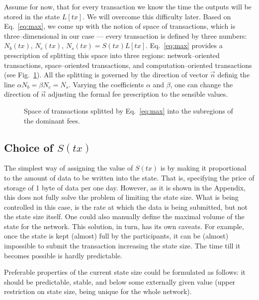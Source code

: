 \documentclass[]{llncs}   %
\newcommand{\authnote}[2]{\marginpar{\parbox{\marginparwidth}{\tiny %
  \textsf{#1 {\textcolor{blue}{notes: #2}}}}}%
  \textcolor{blue}{\textbf{\dag}}}
\newcommand{\authnote}[2]{
  \textsf{#1\textcolor{blue}{ #2}}}
\newcommand{\authnote}[2]{}
\newcommand{\knote}[1]{{\authnote{\textcolor{green}{Alex notes:}}{#1}}}
\newcommand{\vk}[1]{{\authnote{\textcolor{red}{V:}}{#1}}}
\begin{document}
Assume for now, that for every transaction we know the time the outputs will be
stored in the state $L[tx]$. We will overcome this difficulty later. Based on
Eq.~\eqref{eq:max}, we come up with the notion of space of transactions, which
is three--dimensional in our case --- every transaction is defined by three
numbers: $N_b(tx)$, $N_c(tx)$, $N_s(tx) = S(tx)L[tx]$. Eq.~\eqref{eq:max} provides a
prescription of splitting this space into three regions: network--oriented
transactions, space--oriented transactions, and computation--oriented
transactions (see Fig.~\ref{fig:max}). All the splitting is governed by the
direction of vector $\vec{n}$ definig the line $\alpha N_b=\beta N_c=N_s$.
Varying the coefficients $\alpha$ and $\beta$, one can change the direction of
$\vec{n}$ adjusting the formal fee prescription to the sensible values.\vk{It
    would be good and convincing to get some actual data from the existing
network.}
\begin{figure}
    \center
    
    \caption{Space of transactions splitted by
        Eq.~\eqref{eq:max} into the subregions of the dominant fees.\label{fig:max}}
\end{figure}

\subsection{Choice of $S(tx)$}

\knote{Why S(tx), not S(state, tx)? }

The simplest way of assigning the value of $S(tx)$ is by making it proportional to
the amount of data to be written into the state. That is, specifying the price
of storage of 1 byte of data per one day. However, as it is shown in the
Appendix, this does not fully solve the problem of limiting the state size. What
is being controlled in this case, is the rate at which the data is being
submitted, but not the state size itself. One could also manually define the
maximal volume of the state for the network. This solution, in turn, has its own
caveats. For example, once the state is kept (almost) full by the participants,
it can be (almost) impossible to submit the transaction increasing the state size.
The time till it becomes possible is hardly predictable. 

Preferable properties of the current state size could be formulated as follows:
it should be predictable, stable, and below some externally given value (upper
restriction on state size, being unique for the whole network). 
\end{document}
